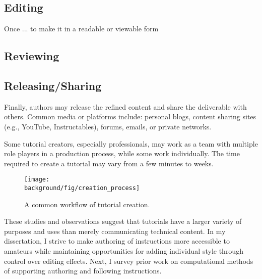 \subsection{Editing}
Once ... to make it in a readable or viewable form

\subsection{Reviewing}

\subsection{Releasing/Sharing}
Finally, authors may release the refined content and share the deliverable with others. Common media or platforms include: personal blogs, content sharing sites (e.g., YouTube, Instructables), forums, emails, or private networks.

Some tutorial creators, especially professionals, may work as a team with multiple role players in a production process, while some work individually. The time required to create a tutorial may vary from a few minutes to weeks.

\begin{figure*}[t]
  \centering
  \texttt{[image: \\background/fig/creation\_process]}
  \caption{A common workflow of tutorial creation. }
  \label{fig:background_creation}
\end{figure*}

These studies and observations suggest that tutorials have a larger variety of purposes and uses than merely communicating technical content.
%
In my dissertation, I strive to make authoring of instructions more accessible to amateurs while maintaining opportunities for adding individual style through control over editing effects.
%
Next, I survey prior work on computational methods of supporting authoring and following instructions.
